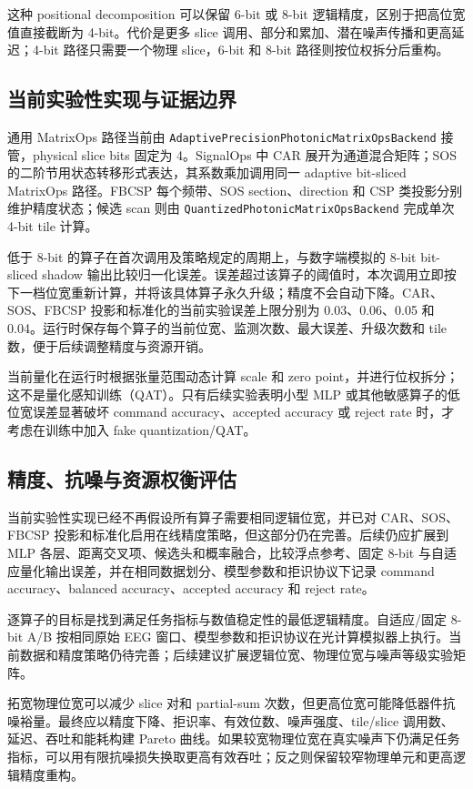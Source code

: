 \documentclass[
    TwoSide=false,
    Degree=graduate,
    GradLevel=master,
    Type=thesis,
    Title={光电混合运动想象脑机接口技术文档}
]{zjuthesis}
\begin{document}
这种 positional decomposition 可以保留 6-bit 或 8-bit 逻辑精度，区别于把高位宽值直接截断为 4-bit。代价是更多 slice 调用、部分和累加、潜在噪声传播和更高延迟；4-bit 路径只需要一个物理 slice，6-bit 和 8-bit 路径则按位权拆分后重构。

\subsection{当前实验性实现与证据边界}
通用 MatrixOps 路径当前由 \texttt{AdaptivePrecision}\allowbreak\texttt{PhotonicMatrixOps}\allowbreak\texttt{Backend} 接管，physical slice bits 固定为 4。SignalOps 中 CAR 展开为通道混合矩阵；SOS 的二阶节用状态转移形式表达，其系数乘加调用同一 adaptive bit-sliced MatrixOps 路径。FBCSP 每个频带、SOS section、direction 和 CSP 类投影分别维护精度状态；候选 scan 则由 \texttt{QuantizedPhotonic}\allowbreak\texttt{MatrixOpsBackend} 完成单次 4-bit tile 计算。

低于 8-bit 的算子在首次调用及策略规定的周期上，与数字端模拟的 8-bit bit-sliced shadow 输出比较归一化误差。误差超过该算子的阈值时，本次调用立即按下一档位宽重新计算，并将该具体算子永久升级；精度不会自动下降。CAR、SOS、FBCSP 投影和标准化的当前实验误差上限分别为 0.03、0.06、0.05 和 0.04。运行时保存每个算子的当前位宽、监测次数、最大误差、升级次数和 tile 数，便于后续调整精度与资源开销。

当前量化在运行时根据张量范围动态计算 scale 和 zero point，并进行位权拆分；这不是量化感知训练（QAT）。只有后续实验表明小型 MLP 或其他敏感算子的低位宽误差显著破坏 command accuracy、accepted accuracy 或 reject rate 时，才考虑在训练中加入 fake quantization/QAT。

\subsection{精度、抗噪与资源权衡评估}
当前实验性实现已经不再假设所有算子需要相同逻辑位宽，并已对 CAR、SOS、FBCSP 投影和标准化启用在线精度策略，但这部分仍在完善。后续仍应扩展到 MLP 各层、距离交叉项、候选头和概率融合，比较浮点参考、固定 8-bit 与自适应量化输出误差，并在相同数据划分、模型参数和拒识协议下记录 command accuracy、balanced accuracy、accepted accuracy 和 reject rate。

逐算子的目标是找到满足任务指标与数值稳定性的最低逻辑精度。自适应/固定 8-bit A/B 按相同原始 EEG 窗口、模型参数和拒识协议在光计算模拟器上执行。当前数据和精度策略仍待完善；后续建议扩展逻辑位宽、物理位宽与噪声等级实验矩阵。

拓宽物理位宽可以减少 slice 对和 partial-sum 次数，但更高位宽可能降低器件抗噪裕量。最终应以精度下降、拒识率、有效位数、噪声强度、tile/slice 调用数、延迟、吞吐和能耗构建 Pareto 曲线。如果较宽物理位宽在真实噪声下仍满足任务指标，可以用有限抗噪损失换取更高有效吞吐；反之则保留较窄物理单元和更高逻辑精度重构。
\end{document}
